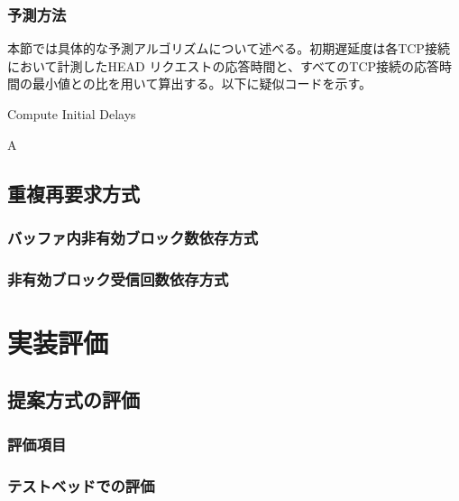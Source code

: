 \documentclass[a4j,12pt]{gradthesis_utf8}
\begin{document}
\subsection{予測方法}
\label{yosokuhouhou}
本節では具体的な予測アルゴリズムについて述べる。初期遅延度は各TCP接続において計測したHEAD リクエストの応答時間と、すべてのTCP接続の応答時間の最小値との比を用いて算出する。以下に疑似コードを示す。

\begin{algorithm}
	\caption{Compute Initial Delays}
	\begin{algorithmic}[1]
		A
		\EndFor
	\end{algorithmic}
	
\end{algorithm}

\section{重複再要求方式}
\subsection{バッファ内非有効ブロック数依存方式}
\subsection{非有効ブロック受信回数依存方式}

\chapter{実装評価}\label{sec:sec4}

\section{提案方式の評価}
\subsection{評価項目}
\subsection{テストベッドでの評価}
\end{document}
